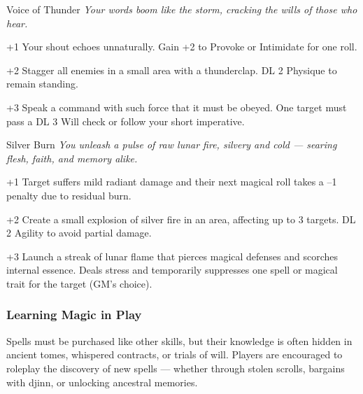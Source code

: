 \begin{WyrdSpell}[Stormcalling]{Voice of Thunder}
\textit{Your words boom like the storm, cracking the wills of those who hear.}
    \begin{WyrdSpellBlock}
        \item[+1] Your shout echoes unnaturally. Gain +2 to Provoke or Intimidate for one roll.
        \item[+2] Stagger all enemies in a small area with a thunderclap. DL 2 Physique to remain standing.
        \item[+3] Speak a command with such force that it must be obeyed. One target must pass a DL 3 Will check or follow your short imperative.
    \end{WyrdSpellBlock}
\end{WyrdSpell}

\begin{WyrdSpell}[Elemental]{Silver Burn}\label{spell:silver-burn}
    \textit{You unleash a pulse of raw lunar fire, silvery and cold — searing flesh, faith, and memory alike.}
    
    \begin{WyrdSpellBlock}
        \item[+1] Target suffers mild radiant damage and their next magical roll takes a –1 penalty due to residual burn.
        
        \item[+2] Create a small explosion of silver fire in an area, affecting up to 3 targets. DL 2 Agility to avoid partial damage.
        
        \item[+3] Launch a streak of lunar flame that pierces magical defenses and scorches internal essence. Deals stress and temporarily suppresses one spell or magical trait for the target (GM’s choice).
    \end{WyrdSpellBlock}
\end{WyrdSpell}

\subsubsection*{Learning Magic in Play}

Spells must be purchased like other skills, but their knowledge is often hidden in ancient tomes, whispered contracts, or trials of will. Players are encouraged to roleplay the discovery of new spells — whether through stolen scrolls, bargains with djinn, or unlocking ancestral memories.

